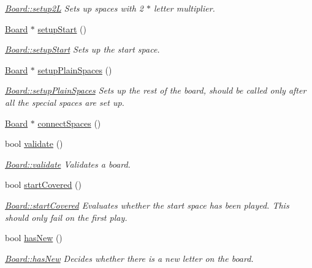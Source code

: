 \begin{DoxyCompactItemize}
\begin{DoxyCompactList}\small\item\em \hyperlink{class_board_a716521053c43060f4ec4b8ce59ab6972}{Board\-::setup2\-L} Sets up spaces with 2 $\ast$ letter multiplier. \end{DoxyCompactList}\item 
\hyperlink{class_board}{Board} $\ast$ \hyperlink{class_board_ab75ded04c7d5b09314fe888ece2fba4f}{setup\-Start} ()
\begin{DoxyCompactList}\small\item\em \hyperlink{class_board_ab75ded04c7d5b09314fe888ece2fba4f}{Board\-::setup\-Start} Sets up the start space. \end{DoxyCompactList}\item 
\hyperlink{class_board}{Board} $\ast$ \hyperlink{class_board_a040fc6830a98b0ff7e6549a07acd65fa}{setup\-Plain\-Spaces} ()
\begin{DoxyCompactList}\small\item\em \hyperlink{class_board_a040fc6830a98b0ff7e6549a07acd65fa}{Board\-::setup\-Plain\-Spaces} Sets up the rest of the board, should be called only after all the special spaces are set up. \end{DoxyCompactList}\item 
\hyperlink{class_board}{Board} $\ast$ \hyperlink{class_board_a29d7c4407f2b3d3052ac7e9d4104f5e6}{connect\-Spaces} ()
\item 
bool \hyperlink{class_board_a6f71df81a77438867e79f956afedb141}{validate} ()
\begin{DoxyCompactList}\small\item\em \hyperlink{class_board_a6f71df81a77438867e79f956afedb141}{Board\-::validate} Validates a board. \end{DoxyCompactList}\item 
bool \hyperlink{class_board_a4a04a6fc41d20c9836b23826dc7f6026}{start\-Covered} ()
\begin{DoxyCompactList}\small\item\em \hyperlink{class_board_a4a04a6fc41d20c9836b23826dc7f6026}{Board\-::start\-Covered} Evaluates whether the start space has been played. This should only fail on the first play. \end{DoxyCompactList}\item 
bool \hyperlink{class_board_a2b0673132c5b8885a10790d9e505bf40}{has\-New} ()
\begin{DoxyCompactList}\small\item\em \hyperlink{class_board_a2b0673132c5b8885a10790d9e505bf40}{Board\-::has\-New} Decides whether there is a new letter on the board. \end{DoxyCompactList}\item 

\end{DoxyCompactItemize}
